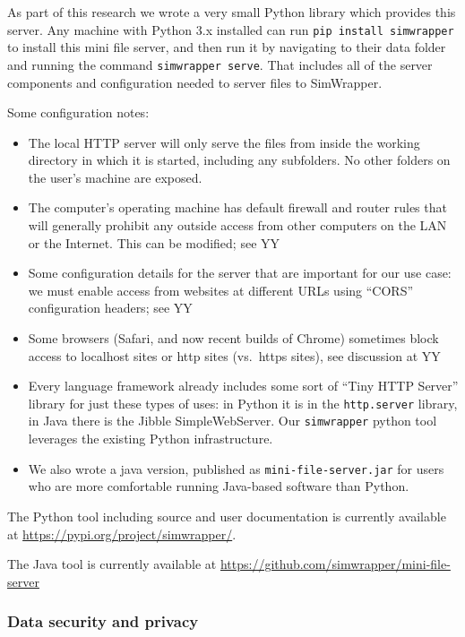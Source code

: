 As part of this research we wrote a very small Python library which
provides this server. Any machine with Python 3.x installed can run
\texttt{pip\ install\ simwrapper} to install this mini file server, and
then run it by navigating to their data folder and running the command
\texttt{simwrapper\ serve}. That includes all of the server components
and configuration needed to server files to SimWrapper.

Some configuration notes:

\begin{itemize}
\item
  The local HTTP server will only serve the files from inside the
  working directory in which it is started, including any subfolders. No
  other folders on the user's machine are exposed.
\item
  The computer's operating machine has default firewall and router rules
  that will generally prohibit any outside access from other computers
  on the LAN or the Internet. This can be modified; see YY
\item
  Some configuration details for the server that are important for our
  use case: we must enable access from websites at different URLs using
  ``CORS'' configuration headers; see YY
\item
  Some browsers (Safari, and now recent builds of Chrome) sometimes
  block access to localhost sites or http sites (vs.~https sites), see
  discussion at YY
\item
  Every language framework already includes some sort of ``Tiny HTTP
  Server'' library for just these types of uses: in Python it is in the
  \texttt{http.server} library, in Java there is the Jibble
  SimpleWebServer. Our \texttt{simwrapper} python tool leverages the
  existing Python infrastructure.
\item
  We also wrote a java version, published as
  \texttt{mini-file-server.jar} for users who are more comfortable
  running Java-based software than Python.
\end{itemize}

The Python tool including source and user documentation is currently
available at \url{https://pypi.org/project/simwrapper/}.

The Java tool is currently available at
\url{https://github.com/simwrapper/mini-file-server}

\hypertarget{data-security-and-privacy}{%
\subsubsection{Data security and
privacy}\label{data-security-and-privacy}}

